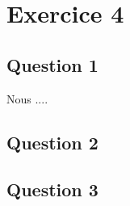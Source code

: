 \documentclass[a4paper,10pt]{article}
\begin{document}
\section{Exercice 4}
\subsection{Question 1}
Nous ....

\subsection{Question 2}

\subsection{Question 3}
\end{document}
